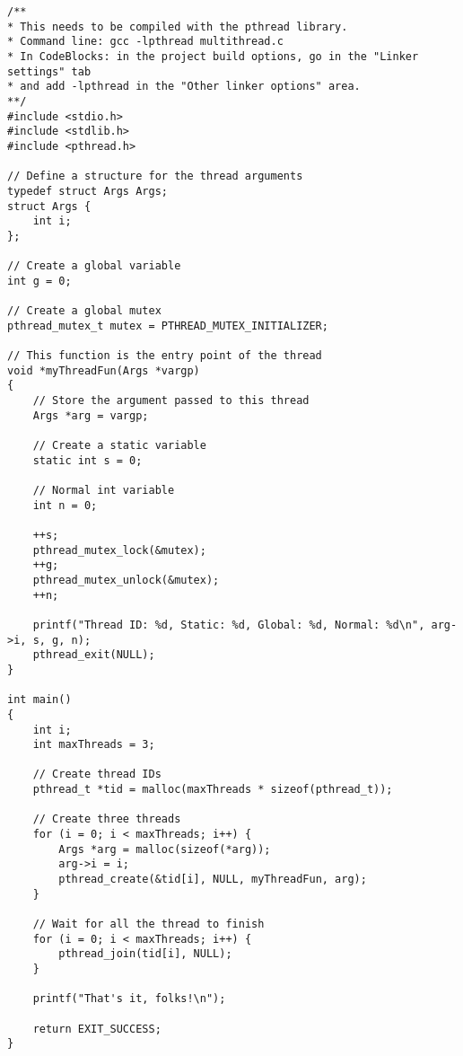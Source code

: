 \documentclass[10pt,a4paper]{article}
\theoremstyle{definition}%
\begin{document}
\begin{verbatim}
/**
* This needs to be compiled with the pthread library.
* Command line: gcc -lpthread multithread.c
* In CodeBlocks: in the project build options, go in the "Linker settings" tab 
* and add -lpthread in the "Other linker options" area.
**/
#include <stdio.h>
#include <stdlib.h>
#include <pthread.h>

// Define a structure for the thread arguments
typedef struct Args Args;
struct Args {
    int i;
};
 
// Create a global variable
int g = 0;

// Create a global mutex
pthread_mutex_t mutex = PTHREAD_MUTEX_INITIALIZER;
 
// This function is the entry point of the thread
void *myThreadFun(Args *vargp)
{
    // Store the argument passed to this thread
    Args *arg = vargp;
 
    // Create a static variable
    static int s = 0;

    // Normal int variable
    int n = 0;

    ++s;
    pthread_mutex_lock(&mutex);
    ++g;
    pthread_mutex_unlock(&mutex);
    ++n;
 
    printf("Thread ID: %d, Static: %d, Global: %d, Normal: %d\n", arg->i, s, g, n);
    pthread_exit(NULL);
}

int main()
{
    int i;
    int maxThreads = 3;

    // Create thread IDs
    pthread_t *tid = malloc(maxThreads * sizeof(pthread_t));
 
    // Create three threads
    for (i = 0; i < maxThreads; i++) {
        Args *arg = malloc(sizeof(*arg));
        arg->i = i;
        pthread_create(&tid[i], NULL, myThreadFun, arg);
    }

    // Wait for all the thread to finish
    for (i = 0; i < maxThreads; i++) {
        pthread_join(tid[i], NULL);
    }

    printf("That's it, folks!\n");
    
    return EXIT_SUCCESS;
}
\end{verbatim}
\end{document}
